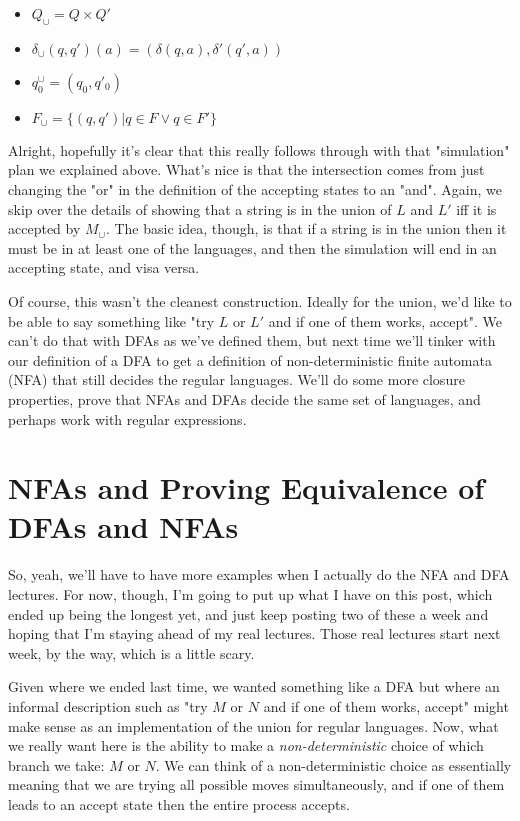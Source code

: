 \documentclass[11pt]{article}
\begin{document}
\begin{itemize}
\item $Q_{\cup} = Q \times Q'$
\item $\delta_{\cup}(q,q')(a) = (\delta(q,a),\delta'(q',a))$
\item $q^{\cup}_0 = (q_0,q'_0)$
\item $F_{\cup} = \{(q,q') | q \in F \vee q \in F'\}$
\end{itemize}

Alright, hopefully it's clear that this really follows through with that "simulation" plan we explained above. What's nice is that the intersection comes from just changing the "or" in the definition of the accepting states to an "and". Again, we skip over the details of showing that a string is in the union of $L$ and $L'$ iff it is accepted by $M_{\cup}$. The basic idea, though, is that if a string is in the union then it must be in at least one of the languages, and then the simulation will end in an accepting state, and visa versa.

Of course, this wasn't the cleanest construction. Ideally for the union, we'd like to be able to say something like "try $L$ or $L'$ and if one of them works, accept". We can't do that with DFAs as we've defined them, but next time we'll tinker with our definition of a DFA to get a definition of non-deterministic finite automata (NFA) that still decides the regular languages. We'll do some more closure properties, prove that NFAs and DFAs decide the same set of languages, and perhaps work with regular expressions.
\section{NFAs and Proving Equivalence of DFAs and NFAs}
\label{sec-3}
So, yeah, we'll have to have more examples when I actually do the NFA and DFA lectures. For now, though, I'm going to put up what I have on this post, which ended up being the longest yet, and just keep posting two of these a week and hoping that I'm staying ahead of my real lectures. Those real lectures start next week, by the way, which is a little scary.

Given where we ended last time, we wanted something like a DFA but where an informal description such as "try $M$ or $N$ and if one of them works, accept" might make sense as an implementation of the union for regular languages. Now, what we really want here is the ability to make a \emph{non-deterministic} choice of which branch we take: $M$ or $N$. We can think of a non-deterministic choice as essentially meaning that we are trying all possible moves simultaneously, and if one of them leads to an accept state then the entire process accepts.
\end{document}
